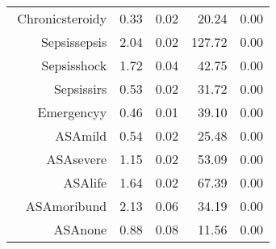 \begin{tabular}{rrrrr}
$$  Chronic\-steroid\-y & 0.33 & 0.02 & 20.24 & 0.00 \\ 
  Sepsis\-sepsis & 2.04 & 0.02 & 127.72 & 0.00 \\ 
  Sepsis\-shock & 1.72 & 0.04 & 42.75 & 0.00 \\ 
  Sepsis\-sirs & 0.53 & 0.02 & 31.72 & 0.00 \\ 
  Emergency\-y & 0.46 & 0.01 & 39.10 & 0.00 \\ 
  ASA\-mild & 0.54 & 0.02 & 25.48 & 0.00 \\ 
  ASA\-severe & 1.15 & 0.02 & 53.09 & 0.00 \\ 
  ASA\-life & 1.64 & 0.02 & 67.39 & 0.00 \\ 
  ASA\-moribund & 2.13 & 0.06 & 34.19 & 0.00 \\ 
  ASA\-none & 0.88 & 0.08 & 11.56 & 0.00 \\ 
   \hline
\end{tabular}

